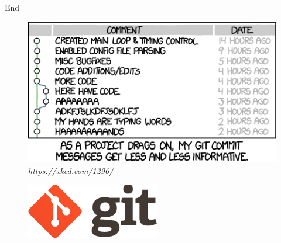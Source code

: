 
\begin{frame}{End}
    \begin{minipage}{0.49\textheight}
        \begin{figure}
            \centering
            \includegraphics[width=\textwidth]{img/xkcd_git_commit.png}
            \caption{\textit{https://xkcd.com/1296/}}
        \end{figure}
    \end{minipage}
    \hspace{1cm}
    \begin{minipage}{0.49\textheight}
        \begin{figure}
        \centering
        \includegraphics[width=\textwidth]{img/git-logo.png}
        \end{figure}
    \end{minipage}
\end{frame}
